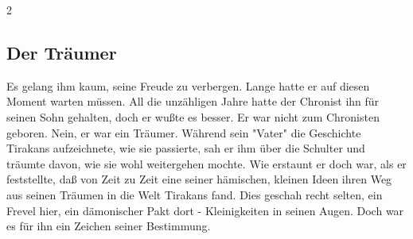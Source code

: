 \begin{multicols*}{2}
\subsection{Der Träumer}\label{subsec:der-traumer}

Es gelang ihm kaum, seine Freude zu verbergen.
Lange hatte er auf diesen Moment warten müssen.
All die unzähligen Jahre hatte der Chronist ihn für seinen Sohn gehalten, doch er wußte es besser.
Er war nicht zum Chronisten geboren.
Nein, er war ein Träumer.
Während sein "Vater" die Geschichte Tirakans aufzeichnete, wie sie passierte, sah er ihm über die Schulter und träumte davon, wie sie wohl weitergehen mochte.
Wie erstaunt er doch war, als er feststellte, daß von Zeit zu Zeit eine seiner hämischen, kleinen Ideen ihren Weg aus seinen Träumen in die Welt Tirakans fand.
Dies geschah recht selten, ein Frevel hier, ein dämonischer Pakt dort - Kleinigkeiten in seinen Augen.
Doch war es für ihn ein Zeichen seiner Bestimmung.

\end{multicols*}

